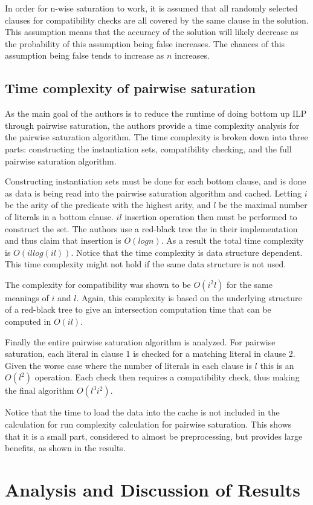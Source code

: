 \documentclass[jair,twoside,11pt,theapa]{article}
\begin{document}
In order for n-wise saturation to work, it is assumed that all randomly selected clauses for compatibility checks are all covered by the same clause in the solution. This assumption means that the accuracy of the solution will likely decrease as the probability of this assumption being false increases. The chances of this assumption being false tends to increase as $n$ increases. 

\subsection{Time complexity of pairwise saturation}
As the main goal of the authors is to reduce the runtime of doing bottom up ILP through pairwise saturation, the authors provide a time complexity analysis for the pairwise saturation algorithm. The time complexity is broken down into three parts: constructing the instantiation sets, compatibility checking, and the full pairwise saturation algorithm. 

Constructing instantiation sets must be done for each bottom clause, and is done as data is being read into the pairwise saturation algorithm and cached. Letting $i$ be the arity of the predicate with the highest arity, and $l$ be the maximal number of literals in a bottom clause. $il$ insertion operation then must be performed to construct the set. The authors use a red-black tree the in their implementation and thus claim that insertion is $O(log n)$. As a result the total time complexity is $O(il log(il))$. Notice that the time complexity is data structure dependent. This time complexity might not hold if the same data structure is not used. 

The complexity for compatibility was shown to be $O(i^2l)$ for the same meanings of $i$ and $l$. Again, this complexity is based on the underlying structure of a red-black tree to give an intersection computation time that can be computed in $O(il)$. 

Finally the entire pairwise saturation algorithm is analyzed. For pairwise saturation, each literal in clause 1 is checked for a matching literal in clause 2. Given the worse case where the number of literals in each clause is $l$ this is an $O(l^2)$ operation. Each check then requires a compatibility check, thus making the final algorithm $O(l^3i^2)$. 

Notice that the time to load the data into the cache is not included in the calculation for run complexity calculation for pairwise saturation. This shows that it is a small part, considered to almost be preprocessing, but provides large benefits, as shown in the results.

\section{Analysis and Discussion of Results}


\vskip 0.2in


\end{document}
